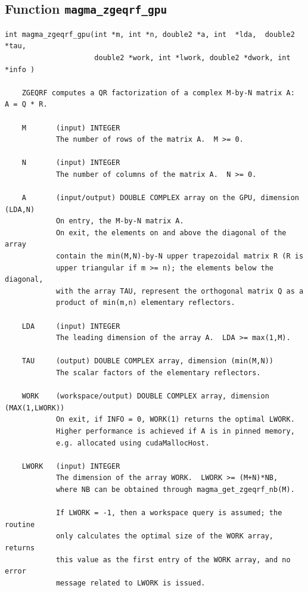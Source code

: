 \documentclass[10pt]{book}
\begin{document}
\newpage
\subsection{Function {\tt {\bf magma\_zgeqrf\_gpu}}}
\begin{verbatim}
int magma_zgeqrf_gpu(int *m, int *n, double2 *a, int  *lda,  double2  *tau,
                     double2 *work, int *lwork, double2 *dwork, int *info )
   
    ZGEQRF computes a QR factorization of a complex M-by-N matrix A:  A = Q * R.   

    M       (input) INTEGER   
            The number of rows of the matrix A.  M >= 0.   

    N       (input) INTEGER   
            The number of columns of the matrix A.  N >= 0.   

    A       (input/output) DOUBLE COMPLEX array on the GPU, dimension (LDA,N)   
            On entry, the M-by-N matrix A.   
            On exit, the elements on and above the diagonal of the array   
            contain the min(M,N)-by-N upper trapezoidal matrix R (R is   
            upper triangular if m >= n); the elements below the diagonal,   
            with the array TAU, represent the orthogonal matrix Q as a   
            product of min(m,n) elementary reflectors.

    LDA     (input) INTEGER   
            The leading dimension of the array A.  LDA >= max(1,M).   

    TAU     (output) DOUBLE COMPLEX array, dimension (min(M,N))   
            The scalar factors of the elementary reflectors.   

    WORK    (workspace/output) DOUBLE COMPLEX array, dimension (MAX(1,LWORK))   
            On exit, if INFO = 0, WORK(1) returns the optimal LWORK.   
            Higher performance is achieved if A is in pinned memory, 
            e.g. allocated using cudaMallocHost.

    LWORK   (input) INTEGER   
            The dimension of the array WORK.  LWORK >= (M+N)*NB,   
            where NB can be obtained through magma_get_zgeqrf_nb(M).

            If LWORK = -1, then a workspace query is assumed; the routine   
            only calculates the optimal size of the WORK array, returns   
            this value as the first entry of the WORK array, and no error   
            message related to LWORK is issued.   


\end{verbatim}
\end{document}
